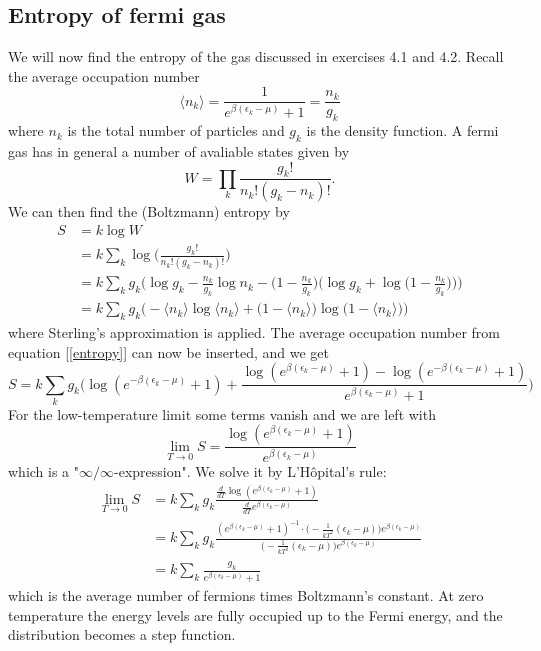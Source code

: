 \documentclass[norsk,a4paper,12pt]{article}
\begin{document}
\subsection{Entropy of fermi gas}
We will now find the entropy of the gas discussed in exercises 4.1 and 4.2. Recall the average occupation number
\begin{equation}
\langle n_k\rangle = \frac{1}{e^{\beta(\epsilon_k-\mu)}+1}=\frac{n_k}{g_k}
\label{entropy}
\end{equation}
where $n_k$ is the total number of particles and $g_k$ is the density function. A fermi gas has in general a number of avaliable states given by
\begin{equation}
W=\prod_k\frac{g_k!}{n_k!(g_k-n_k)!}.
\end{equation}
We can then find the (Boltzmann) entropy by
\begin{align}
S&=k\log W\\
&=k\sum_k\log\bigg(\frac{g_k!}{n_k!(g_k-n_k)!}\bigg)\\
&=k\sum_kg_k\bigg(\log g_k-\frac{n_k}{g_k}\log n_k-\Big(1-\frac{n_k}{g_k}\Big)\Big(\log g_k + \log\big(1-\frac{n_k}{g_k}\big)\Big)\bigg)\\
&=k\sum_kg_k\Big(-\langle n_k\rangle\log\langle n_k\rangle+\big(1-\langle n_k\rangle\big)\log\big(1-\langle n_k\rangle\big)\Big)
\end{align}
where Sterling's approximation is applied. The average occupation number from equation [\ref{entropy}] can now be inserted, and we get
\begin{equation*}
S=k\sum_kg_k\bigg(\log(e^{-\beta(\epsilon_k-\mu)}+1)+\frac{\log(e^{\beta(\epsilon_k-\mu)}+1)-\log(e^{-\beta(\epsilon_k-\mu)}+1)}{e^{\beta(\epsilon_k -\mu)}+1}\bigg)
\end{equation*}
For the low-temperature limit some terms vanish and we are left with
\begin{equation}
\lim_{T\rightarrow 0}S=\frac{\log(e^{\beta(\epsilon_k-\mu)}+1)}{e^{\beta(\epsilon_k -\mu)}}
\end{equation}
which is a "$\infty/\infty$-expression". We solve it by L'Hôpital's rule:
\begin{align}
\lim_{T\rightarrow 0}S&=k\sum_kg_k\frac{\frac{d}{dT}\log(e^{\beta(\epsilon_k-\mu)}+1)}{\frac{d}{dT}e^{\beta(\epsilon_k -\mu)}}\\
&=k\sum_kg_k\frac{(e^{\beta(\epsilon_k-\mu)}+1)^{-1}\cdot\big(-\frac{1}{kT^2}(\epsilon_k-\mu)\big)e^{\beta(\epsilon_k-\mu)}}{\big(-\frac{1}{kT^2}(\epsilon_k-\mu)\big)e^{\beta(\epsilon_k-\mu)}}\\
&=k\sum_k\frac{g_k}{e^{\beta(\epsilon_k-\mu)}+1}
\end{align}
which is the average number of fermions times Boltzmann's constant. At zero temperature the energy levels are fully occupied up to the Fermi energy, and the distribution becomes a step function. 
\end{document}
